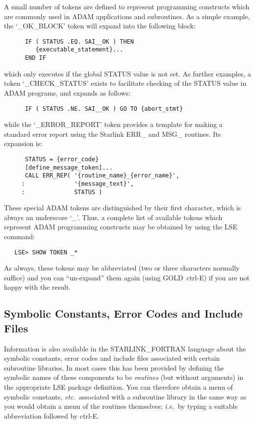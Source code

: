 A small number of tokens are defined to represent programming constructs 
which are commonly used in ADAM applications and subroutines.
As a simple example, the \mbox{`\_OK\_BLOCK'} token will expand into the
following block: 

\begin{verbatim}
      IF ( STATUS .EQ. SAI__OK ) THEN
         {executable_statement}...
      END IF
\end{verbatim}

which only executes if the global \mbox{STATUS} value is not set. 
As further examples, a token \mbox{`\_CHECK\_STATUS'} exists to facilitate
checking of the \mbox{STATUS} value in \mbox{ADAM} programs, and expands as
follows: 

\begin{verbatim}
      IF ( STATUS .NE. SAI__OK ) GO TO {abort_stmt}
\end{verbatim}

while the \mbox{`\_ERROR\_REPORT'} token provides a template for making a
standard error report using the Starlink \mbox{ERR\_} and \mbox{MSG\_}
routines. 
Its expansion is:

\begin{verbatim}
      STATUS = {error_code}
      [define_message_token]...
      CALL ERR_REP( '{routine_name}_{error_name}',
     :              '{message_text}',
     :              STATUS )
\end{verbatim}

These special \mbox{ADAM} tokens are distinguished by their first character,
which is always an underscore `\_'. 
Thus, a complete list of available tokens which represent \mbox{ADAM}
programming constructs may be obtained by using the \mbox{LSE} command: 

\begin{verbatim}
   LSE> SHOW TOKEN _*
\end{verbatim}

As always, these tokens may be abbreviated (two or three characters normally
suffice) and you can ``un-expand'' them again (using
\mbox{GOLD}~\mbox{ctrl-E}) if you are not happy with the result. 


\subsection{Symbolic Constants, Error Codes and Include Files}

Information is also available in the \mbox{STARLINK\_FORTRAN} language about
the symbolic constants, error codes and include files associated with
certain subroutine libraries. 
In most cases this has been provided by defining the symbolic names of these
components to be {\em routines} (but without arguments) in the appropriate
LSE package definition. 
You can therefore obtain a menu of symbolic constants, {\em etc.}\
associated with a subroutine library in the same way as you would obtain a
menu of the routines themselves; {\em i.e.}\ by typing a suitable
abbreviation followed by \mbox{ctrl-E}. 

